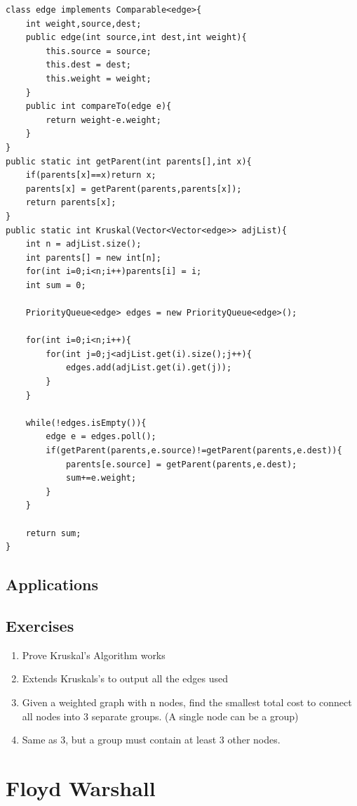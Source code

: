 \documentclass[11pt,oneside]{book}
\begin{document}
\begin{lstlisting}
class edge implements Comparable<edge>{
    int weight,source,dest;
    public edge(int source,int dest,int weight){
        this.source = source;
        this.dest = dest;
        this.weight = weight;
    }
    public int compareTo(edge e){
        return weight-e.weight;
    }
}
public static int getParent(int parents[],int x){
    if(parents[x]==x)return x;
    parents[x] = getParent(parents,parents[x]);
    return parents[x];
}
public static int Kruskal(Vector<Vector<edge>> adjList){
    int n = adjList.size();
    int parents[] = new int[n];
    for(int i=0;i<n;i++)parents[i] = i;
    int sum = 0;
    
    PriorityQueue<edge> edges = new PriorityQueue<edge>();
    
    for(int i=0;i<n;i++){
        for(int j=0;j<adjList.get(i).size();j++){
            edges.add(adjList.get(i).get(j));
        }
    }
    
    while(!edges.isEmpty()){
        edge e = edges.poll();
        if(getParent(parents,e.source)!=getParent(parents,e.dest)){
            parents[e.source] = getParent(parents,e.dest);
            sum+=e.weight;
        }
    }
    
    return sum;
}
\end{lstlisting}

\subsection{Applications}

\subsection{Exercises}

\begin{enumerate}
\item Prove Kruskal's Algorithm works
\item Extends Kruskals's to output all the edges used
\item Given a weighted graph with n nodes, find the smallest total cost to connect all nodes into 3 separate groups. (A single node can be a group)
\item Same as 3, but a group must contain at least 3 other nodes.
\end{enumerate}
\section{Floyd Warshall}
\end{document}
